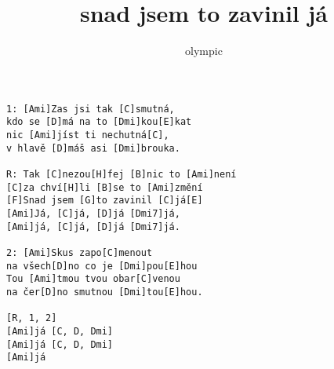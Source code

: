 \author{olympic}
\title{snad jsem to zavinil já}
\maketitle
\begin{verbatim}
1: [Ami]Zas jsi tak [C]smutná, 
kdo se [D]má na to [Dmi]kou[E]kat
nic [Ami]jíst ti nechutná[C], 
v hlavě [D]máš asi [Dmi]brouka. 

R: Tak [C]nezou[H]fej [B]nic to [Ami]není 
[C]za chví[H]li [B]se to [Ami]změní 
[F]Snad jsem [G]to zavinil [C]já[E]
[Ami]Já, [C]já, [D]já [Dmi7]já, 
[Ami]já, [C]já, [D]já [Dmi7]já. 

2: [Ami]Skus zapo[C]menout
na všech[D]no co je [Dmi]pou[E]hou
Tou [Ami]tmou tvou obar[C]venou
na čer[D]no smutnou [Dmi]tou[E]hou.

[R, 1, 2]
[Ami]já [C, D, Dmi]
[Ami]já [C, D, Dmi]
[Ami]já

\end{verbatim}